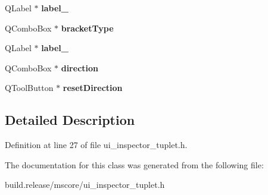 \begin{DoxyCompactItemize}
Q\+Label $\ast$ {\bfseries label\+\_}
\item 
\mbox{\label{class_ui___inspector_tuplet_a004ca98670ec043141e783d2964be7c5}} 
Q\+Combo\+Box $\ast$ {\bfseries bracket\+Type}
\item 
\mbox{\label{class_ui___inspector_tuplet_a420833c62b9b1a3134228d92886469e0}} 
Q\+Label $\ast$ {\bfseries label\+\_}
\item 
\mbox{\label{class_ui___inspector_tuplet_a90e171a9c2304b603d3a282af12f785e}} 
Q\+Combo\+Box $\ast$ {\bfseries direction}
\item 
\mbox{\label{class_ui___inspector_tuplet_acfaebeb08caccf96925fbb17537bc02b}} 
Q\+Tool\+Button $\ast$ {\bfseries reset\+Direction}
\end{DoxyCompactItemize}


\subsection{Detailed Description}


Definition at line 27 of file ui\+\_\+inspector\+\_\+tuplet.\+h.



The documentation for this class was generated from the following file\+:\begin{DoxyCompactItemize}
\item 
build.\+release/mscore/ui\+\_\+inspector\+\_\+tuplet.\+h\end{DoxyCompactItemize}
